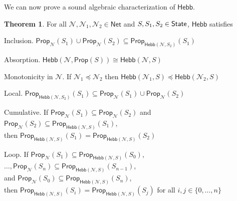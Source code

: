 \documentclass[letterpaper]{article}
\theoremstyle{definition}
\newtheorem{theorem}{Theorem}
\newcommand{\State}{\mbox{\sf State}}
\newcommand{\set}[1]{\{ #1 \}}
\newcommand{\Prop}{\textsf{Prop}}
\newcommand{\Hebb}{\textsf{Hebb}}
\newcommand{\AllNets}{\mathsf{Net}}
\newcommand{\Net}{\mathcal{N}}
\begin{document}
We can now prove a sound algebraic characterization of $\Hebb$.

\begin{theorem}
For all $\Net, \Net_1, \Net_2 \in \AllNets$ and $S, S_1, S_2 \in \State$, $\Hebb$ satisfies
\begin{compactdesc}
    \item[Inclusion.]
    $\Prop_\Net(S_1) \cup \Prop_\Net(S_2) \subseteq \Prop_{\Hebb(\Net, S_2)}(S_1)$
    
    \item[Absorption.]
    $\Hebb(\Net, \Prop(S)) \cong \Hebb(\Net, S)$
    
    \item[Monotonicity in $\Net$.] If ${\Net_1 \preceq \Net_2}$
    then ${\Hebb(\Net_1, S) \preceq \Hebb(\Net_2, S)}$
    
    \item[Local.]
    $\Prop_{\Hebb(\Net, S_2)}(S_1) \subseteq \Prop_\Net(S_1) \cup \Prop_\Net(S_2)$
    
    \item[Cumulative.] If ${\Prop_\Net(S_1) \subseteq \Prop_\Net(S_2)}$ and ${\Prop_\Net(S_2) \subseteq \Prop_{\Hebb(\Net, S)}(S_1)}$,\\
    then $\Prop_{\Hebb(\Net, S)}(S_1) = \Prop_{\Hebb(\Net, S)}(S_2)$
    
    \item[Loop.] If ${\Prop_\Net(S_1) \subseteq \Prop_{\Hebb(\Net, S)}(S_0)}$,
    $\ldots, {\Prop_\Net(S_n) \subseteq \Prop_{\Hebb(\Net, S)}(S_{n-1})}$,\\
    and 
    ${\Prop_\Net(S_0) \subseteq \Prop_{\Hebb(\Net, S)}(S_n)}$,\\
    then ${\Prop_{\Hebb(\Net, S)}(S_i) = \Prop_{\Hebb(\Net, S)}(S_j)}$
    for all $i, j \in \set{0, \ldots, n}$
\end{compactdesc}
\label{thm:inc-props}
\end{theorem}
\end{document}
